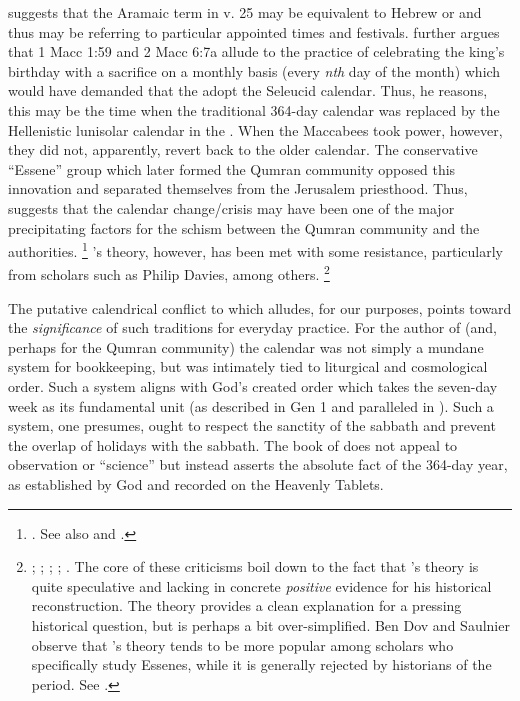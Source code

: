 \noindent
\vanderkam suggests that the Aramaic term  in v. 25 may be equivalent to Hebrew  or  and thus may be referring to particular appointed times and festivals.%
    \autocite[59--60]{vanderkam_jsj1981}
\vanderkam further argues that 1 Macc 1:59 and 2 Macc 6:7a allude to the practice of celebrating the king's birthday with a sacrifice on a monthly basis (every \emph{nth} day of the month) which would have demanded that the \jerusalemtemple adopt the Seleucid calendar. Thus, he reasons, this may be the time when the traditional 364-day calendar was replaced by the Hellenistic lunisolar calendar in the \jerusalemtemple. When the Maccabees took power, however, they did not, apparently, revert back to the older calendar. The conservative ``Essene'' group which later formed the Qumran community opposed this innovation and separated themselves from the Jerusalem priesthood. Thus, \vanderkam suggests that the calendar change/crisis may have been one of the major precipitating factors for the schism between the Qumran community and the \jerusalemtemple authorities.%
    \footnote{%
        \Cite[52]{vanderkam_jsj1981}. See also 
        \cite{collins_chazon-etal1999} and 
        \cite{blenkinsopp_sanders1981}.}
\vanderkam's theory, however, has been met with some resistance, particularly from scholars such as Philip Davies, among others.%
    \footnote{%
        \cite{davies_cbq1983};
        \cite{wacholder-wacholder_huca1995};
        \cite{stern_lim-etal2000};
        \cite{stern_zpe2000};
        \cite[29 n. 136]{stern2001}.
        The core of these criticisms boil down to the fact that \vanderkam's theory is quite speculative and lacking in concrete \emph{positive} evidence for his historical reconstruction. The theory provides a clean explanation for a pressing historical question, but is perhaps a bit over-simplified. Ben Dov and Saulnier observe that \vanderkam's theory tends to be more popular among scholars who specifically study Essenes, while it is generally rejected by historians of the \secondtemple period. See \cite[142]{bendov-saulnier_cbr2008}.}

The putative calendrical conflict to which \jub alludes, for our purposes, points toward the \emph{significance} of such traditions for everyday practice. For the author of \jub (and, perhaps for the Qumran community) the calendar was not simply a mundane system for bookkeeping, but was intimately tied to liturgical  and cosmological order.%
    \autocite{fraade_dine-israel2010}
Such a system aligns with God's created order which takes the seven-day week as its fundamental unit (as described in Gen 1 and paralleled in ). Such a system, one presumes, ought to respect the sanctity of the sabbath and prevent the overlap of holidays with the sabbath. The book of \jub does not appeal to observation or ``science'' but instead asserts the absolute fact of the 364-day year, as established by God and recorded on the Heavenly Tablets. 

